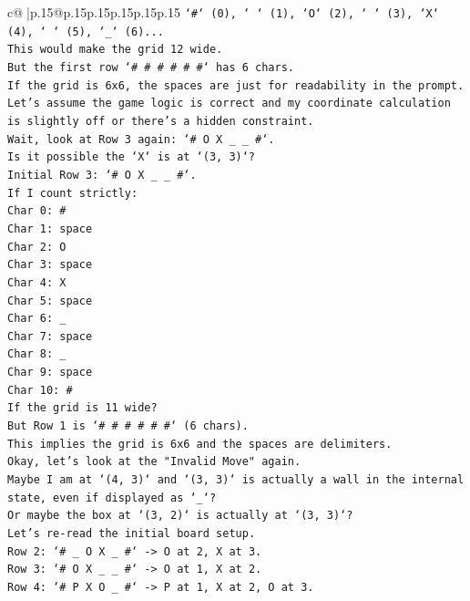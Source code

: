 \documentclass{article}
\begin{document}
{\begin{supertabular}{c@{$\;$}|p{.15\linewidth}@{}p{.15\linewidth}p{.15\linewidth}p{.15\linewidth}p{.15\linewidth}p{.15\linewidth}}
{{{\texttt{`\#` (0), ` ` (1), `O` (2), ` ` (3), `X` (4), ` ` (5), `\_` (6)...} \\
\texttt{This would make the grid 12 wide.} \\
\texttt{But the first row `\# \# \# \# \# \#` has 6 chars.} \\
\texttt{If the grid is 6x6, the spaces are just for readability in the prompt.} \\
\texttt{Let's assume the game logic is correct and my coordinate calculation is slightly off or there's a hidden constraint.} \\
\texttt{Wait, look at Row 3 again: `\# O X \_ \_ \#`.} \\
\texttt{Is it possible the `X` is at `(3, 3)`?} \\
\texttt{Initial Row 3: `\# O X \_ \_ \#`.} \\
\texttt{If I count strictly:} \\
\texttt{Char 0: \#} \\
\texttt{Char 1: space} \\
\texttt{Char 2: O} \\
\texttt{Char 3: space} \\
\texttt{Char 4: X} \\
\texttt{Char 5: space} \\
\texttt{Char 6: \_} \\
\texttt{Char 7: space} \\
\texttt{Char 8: \_} \\
\texttt{Char 9: space} \\
\texttt{Char 10: \#} \\
\texttt{If the grid is 11 wide?} \\
\texttt{But Row 1 is `\# \# \# \# \# \#` (6 chars).} \\
\texttt{This implies the grid is 6x6 and the spaces are delimiters.} \\
\texttt{Okay, let's look at the "Invalid Move" again.} \\
\texttt{Maybe I am at `(4, 3)` and `(3, 3)` is actually a wall in the internal state, even if displayed as `\_`?} \\
\texttt{Or maybe the box at `(3, 2)` is actually at `(3, 3)`?} \\
\texttt{Let's re{-}read the initial board setup.} \\
\texttt{Row 2: `\# \_ O X \_ \#` {-}> O at 2, X at 3.} \\
\texttt{Row 3: `\# O X \_ \_ \#` {-}> O at 1, X at 2.} \\
\texttt{Row 4: `\# P X O \_ \#` {-}> P at 1, X at 2, O at 3.} \\
}}}
\end{supertabular}}
\end{document}
